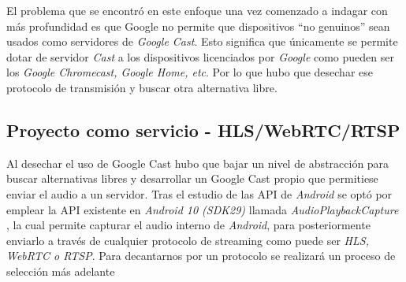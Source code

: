 El problema que se encontró en este enfoque una vez comenzado a indagar con más
profundidad es que Google no permite que dispositivos ``no genuinos'' sean
usados como servidores de \emph{Google Cast}. Esto significa que únicamente se
permite dotar de servidor \emph{Cast} a los dispositivos licenciados por
\emph{Google} como pueden ser los \emph{Google Chromecast, Google Home, etc}.
Por lo que hubo que desechar ese protocolo de transmisión y buscar otra
alternativa libre.

\subsection{Proyecto como servicio - HLS/WebRTC/RTSP}

Al desechar el uso de Google Cast hubo que bajar un nivel de abstracción para
buscar alternativas libres y desarrollar un Google Cast propio que permitiese
enviar el audio a un servidor. Tras el estudio de las API de \emph{Android} se
optó por emplear la API existente en \emph{Android 10 (SDK29)} llamada
\emph{AudioPlaybackCapture} \cite{api-audio-capture}, la cual permite capturar el audio interno de
\emph{Android}, para posteriormente enviarlo a través de cualquier protocolo de
streaming como puede ser \emph{HLS, WebRTC o RTSP}. Para decantarnos por un
protocolo se realizará un proceso de selección más adelante